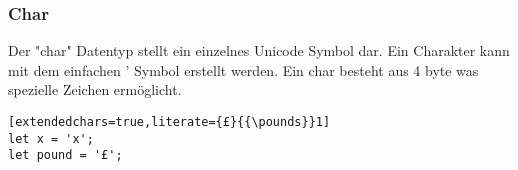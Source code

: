 \subsubsection{Char}
Der "char" Datentyp stellt ein einzelnes Unicode Symbol dar. Ein Charakter kann mit dem einfachen ' Symbol erstellt werden. Ein char besteht aus 4 byte was spezielle Zeichen ermöglicht.

\begin{lstlisting}[extendedchars=true,literate={£}{{\pounds}}1]
let x = 'x';
let pound = '£';
\end{lstlisting}
